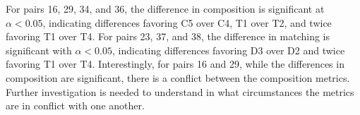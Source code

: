 %
%
%
%
%



 
For pairs 16, 29, 34, and 36, the difference in composition is significant at $\alpha < 0.05$, indicating differences favoring C5 over C4, T1 over T2, and twice favoring T1 over T4. 
For pairs 23, 37, and 38, the difference in matching is significant with $\alpha < 0.05$, indicating differences favoring D3 over D2 and twice favoring T1 over T4. 
Interestingly, for pairs 16 and 29, while the differences in composition are significant, there is a conflict between the composition metrics. Further investigation is needed to understand in what circumstances the metrics are in conflict with one another. 



